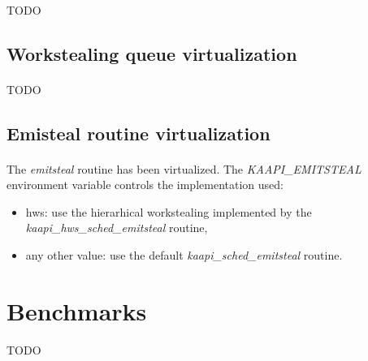 \documentclass[a4paper, 11pt]{article}
\begin{document}
\paragraph{}
TODO

\subsection{Workstealing queue virtualization}
\paragraph{}
TODO

\subsection{Emisteal routine virtualization}
\paragraph{}
The \textit{emitsteal} routine has been virtualized. The
\textit{KAAPI\_EMITSTEAL} environment variable controls the
implementation used:
\begin{itemize}
\item hws: use the hierarhical workstealing implemented by the
\textit{kaapi\_hws\_sched\_emitsteal} routine,
\item any other value: use the default \textit{kaapi\_sched\_emitsteal} routine.
\end{itemize}


%
\newpage
\section{Benchmarks}
\paragraph{}
TODO
\end{document}
